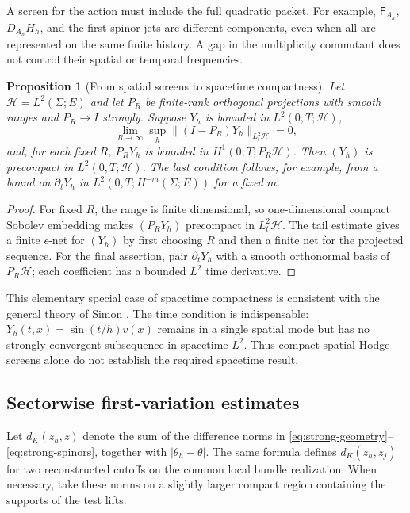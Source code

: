\documentclass[11pt]{article}
\numberwithin{equation}{section}
\newtheorem{proposition}[proposition]{Proposition}
\theoremstyle{definition}
\theoremstyle{remark}
\newcommand{\norm}[1]{\lVert#1\rVert}
\newcommand{\abs}[1]{\lvert#1\rvert}
\newcommand{\Fcurv}{\mathsf F}
\begin{document}
A screen for the action must include the full quadratic packet. For example, $\Fcurv_{A_h}$, $D_{A_h}H_h$, and the first spinor jets are different components, even when all are represented on the same finite history. A gap in the multiplicity commutant does not control their spatial or temporal frequencies.

\begin{proposition}[From spatial screens to spacetime compactness]
\label{prop:time-compactness}
Let $\mathcal H=L^2(\Sigma;E)$ and let $P_R$ be finite-rank orthogonal projections with smooth ranges and $P_R\to I$ strongly. Suppose $Y_h$ is bounded in $L^2(0,T;\mathcal H)$,
\[
 \lim_{R\to\infty}\sup_h\norm{(I-P_R)Y_h}_{L^2_t\mathcal H}=0,
\]
and, for each fixed $R$, $P_RY_h$ is bounded in $H^1(0,T;P_R\mathcal H)$. Then $(Y_h)$ is precompact in $L^2(0,T;\mathcal H)$. The last condition follows, for example, from a bound on $\partial_tY_h$ in $L^2(0,T;H^{-m}(\Sigma;E))$ for a fixed $m$.
\end{proposition}
\begin{proof}
For fixed $R$, the range is finite dimensional, so one-dimensional compact Sobolev embedding makes $(P_RY_h)$ precompact in $L^2_t\mathcal H$. The tail estimate gives a finite $\epsilon$-net for $(Y_h)$ by first choosing $R$ and then a finite net for the projected sequence. For the final assertion, pair $\partial_tY_h$ with a smooth orthonormal basis of $P_R\mathcal H$; each coefficient has a bounded $L^2$ time derivative.
\end{proof}

This elementary special case of spacetime compactness is consistent with the general theory of Simon \cite{Simon1986}. The time condition is indispensable: $Y_h(t,x)=\sin(t/h)v(x)$ remains in a single spatial mode but has no strongly convergent subsequence in spacetime $L^2$. Thus compact spatial Hodge screens alone do not establish the required spacetime result.

\subsection{Sectorwise first-variation estimates}
\label{app:sectorwise-variation}

Let $d_K(z_h,z)$ denote the sum of the difference norms in \eqref{eq:strong-geometry}--\eqref{eq:strong-spinors}, together with $\abs{\theta_h-\theta}$.  The same formula defines $d_K(z_h,z_j)$ for two reconstructed cutoffs on the common local bundle realization.  When necessary, take these norms on a slightly larger compact region containing the supports of the test lifts.
\end{document}
